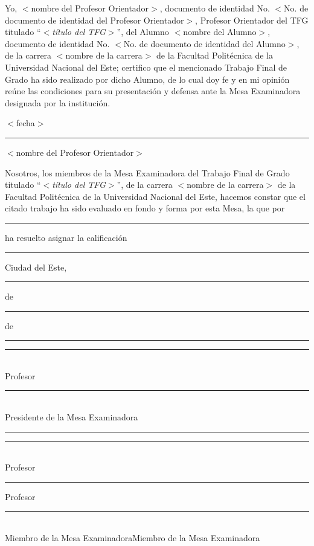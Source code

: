 \thispagestyle{empty}

Yo, $<$nombre del Profesor Orientador$>$, documento de identidad No. $<$No. de documento de identidad del Profesor Orientador$>$, Profesor Orientador del TFG titulado ``$<$\textit{título del TFG}$>$'', del Alumno $<$nombre del Alumno$>$, documento de identidad No. $<$No. de documento de identidad del Alumno$>$, de la carrera $<$nombre de la carrera$>$ de la Facultad Politécnica de la Universidad Nacional del Este; certifico que el mencionado Trabajo Final de Grado ha sido realizado por dicho Alumno, de lo cual doy fe y en mi opinión reúne las condiciones para su presentación y defensa ante la Mesa Examinadora designada por la institución.

\begin{flushright}$<$fecha$>$\end{flushright}
\vspace{0.7cm}
	
\hspace{7cm}\rule{6cm}{0.4pt}
\begin{flushright}
$<$nombre del Profesor Orientador$>$
\end{flushright}
		
\vspace{1.6cm}
Nosotros, los miembros de la Mesa Examinadora del Trabajo Final de Grado titulado ``$<$\textit{título del TFG}$>$'', de la carrera $<$nombre de la carrera$>$ de la Facultad Politécnica de la Universidad Nacional del Este, hacemos constar que el citado trabajo ha sido evaluado en fondo y forma por esta Mesa, la que por \rule{4cm}{0.4pt} ha resuelto asignar la calificación \rule{2cm}{0.4pt}

\begin{flushright}Ciudad del Este, \rule{1cm}{0.4pt} de \rule{2cm}{0.4pt} de \rule{1cm}{0.4pt} \end{flushright}

\vspace{.5cm}
\hspace{2.2cm}\rule{7cm}{0.4pt}\\
\hspace*{3cm} Profesor \rule{4.5cm}{0.4pt}\\
\hspace*{2.8cm} Presidente de la Mesa Examinadora
\vspace{.7cm}

\hspace*{-0.4cm}\rule{6cm}{0.4pt}\hspace{1.15cm}\rule{6cm}{0.4pt}\\
\vspace{.3cm}
Profesor \rule{4.5cm}{0.4pt}		\hspace{.9cm}Profesor \rule{4.5cm}{0.4pt}\\
Miembro de la Mesa Examinadora\hspace{1cm}Miembro de la Mesa Examinadora
